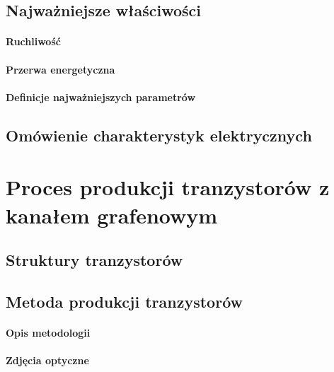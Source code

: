		\subsection{Najważniejsze właściwości}
			\paragraph{Ruchliwość}
			\paragraph{Przerwa energetyczna}
			\paragraph{Definicje najważniejszych parametrów}
		\subsection{Omówienie charakterystyk elektrycznych}


	\section{Proces produkcji tranzystorów z kanałem grafenowym}
		\subsection{Struktury tranzystorów}
		\subsection{Metoda produkcji tranzystorów}
			\paragraph{Opis metodologii}
			\paragraph{Zdjęcia optyczne}
